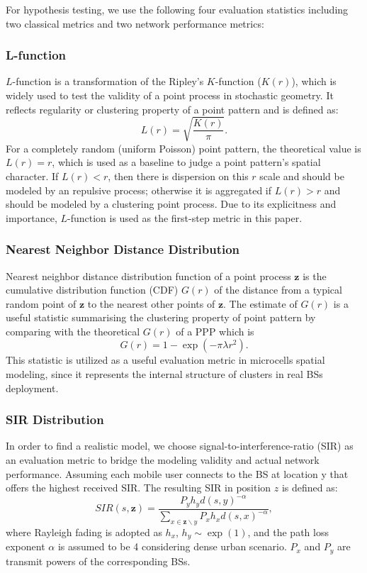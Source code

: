 \documentclass[conference]{IEEEtran}
\begin{document}
For hypothesis testing, we use the following four evaluation statistics including two classical metrics and two network performance metrics:
\setcounter{subsubsection}{0}
\subsubsection{\bf{L-function}}
$L$-function is a transformation of the Ripley's $K$-function ($K(r)$), which is widely used to test the validity of a point process in stochastic geometry\cite{ripley1991statistical}. It reflects regularity or clustering property of a point pattern and is defined as:
\begin{equation}
L(r)=\sqrt{\frac{K(r)}{\pi}}.
\end{equation}
For a completely random (uniform Poisson) point pattern, the theoretical value is $L(r)=r$, which is used as a baseline to judge a point pattern's spatial character\cite{ripley1991statistical}. If $L(r)<r$, then there is dispersion on this $r$ scale and should be modeled by an repulsive process; otherwise it is aggregated if $L(r)>r$ and should be modeled by a clustering point process. Due to its explicitness and importance, $L$-function is used as the first-step metric in this paper.

\subsubsection{\bf{Nearest Neighbor Distance Distribution}}
Nearest neighbor distance distribution function of a point process $\mathbf{z}$ is the cumulative distribution function (CDF) $G(r)$ of the distance from a typical random point of $\mathbf{z}$ to the nearest other points of $\mathbf{z}$\cite{ripley1991statistical}. The estimate of $G(r)$ is a useful statistic summarising the clustering property of point pattern by comparing with the theoretical $G(r)$ of a PPP which is
\begin{equation}
G(r)=1-\exp(-\pi\lambda r^2).
\end{equation}
This statistic is utilized as a useful evaluation metric in microcells spatial modeling, since it represents the internal structure of clusters in real BSs deployment.

\subsubsection{\bf{SIR Distribution}}
In order to find a realistic model, we choose signal-to-interference-ratio (SIR) as an evaluation metric to bridge the modeling validity and actual network performance. Assuming each mobile user connects to the BS at location y that offers the highest received SIR. The resulting SIR in position $z$ is defined as:
\begin{equation}
SIR(s, \mathbf{z})= \frac{P_yh_yd(s,y)^{-\alpha}}{\sum_{x\in\mathbf{z}\backslash y}P_xh_xd(s,x)^{-\alpha}},
\end{equation}
where Rayleigh fading is adopted as $h_x$, $h_y\sim\exp(1)$, and the path loss exponent $\alpha$ is assumed to be 4 considering dense urban scenario. $P_x$ and $P_y$ are transmit powers of the corresponding BSs.
\end{document}
